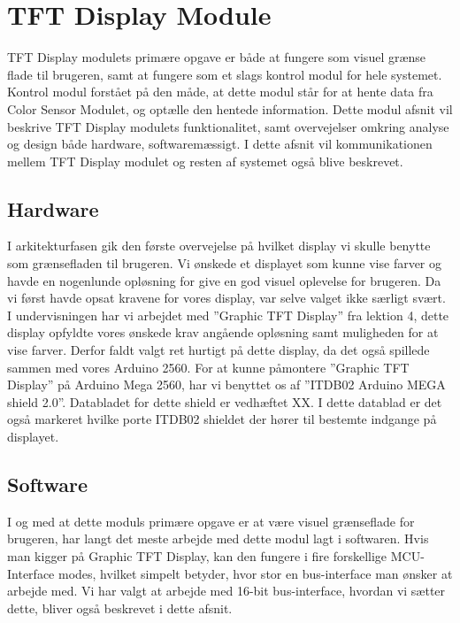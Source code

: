 \graphicspath{{Chapters/Struktur/}}

\section{TFT Display Module}
TFT Display modulets primære opgave er både at fungere som visuel grænse flade til brugeren, samt at fungere som et slags kontrol modul for hele systemet. Kontrol modul forstået på den måde, at dette modul står for at hente data fra Color Sensor Modulet, og optælle den hentede information. Dette modul afsnit vil beskrive TFT Display modulets funktionalitet, samt overvejelser omkring analyse og design både hardware, softwaremæssigt. I dette afsnit vil kommunikationen mellem TFT Display modulet og resten af systemet også blive beskrevet. 

\subsection{Hardware}
I arkitekturfasen gik den første overvejelse på hvilket display vi skulle benytte som grænsefladen til brugeren. Vi ønskede et displayet som kunne vise farver og havde en nogenlunde opløsning for give en god visuel oplevelse for brugeren. Da vi først havde opsat kravene for vores display, var selve valget ikke særligt svært. I undervisningen har vi arbejdet med ”Graphic TFT Display” fra lektion 4, dette display opfyldte vores ønskede krav angående opløsning samt muligheden for at vise farver. Derfor faldt valgt ret hurtigt på dette display, da det også spillede sammen med vores Arduino 2560. For at kunne påmontere ”Graphic TFT Display” på Arduino Mega 2560, har vi benyttet os af ”ITDB02 Arduino MEGA shield 2.0”. Databladet for dette shield er vedhæftet XX. I dette datablad er det også markeret hvilke porte ITDB02 shieldet der hører til bestemte indgange på displayet.

\subsection{Software}
I og med at dette moduls primære opgave er at være visuel grænseflade for brugeren, har langt det meste arbejde med dette modul lagt i softwaren. 
Hvis man kigger på Graphic TFT Display, kan den fungere i fire forskellige MCU-Interface modes, hvilket simpelt betyder, hvor stor en bus-interface man ønsker at arbejde med. Vi har valgt at arbejde med 16-bit bus-interface, hvordan vi sætter dette, bliver også beskrevet i dette afsnit. 

